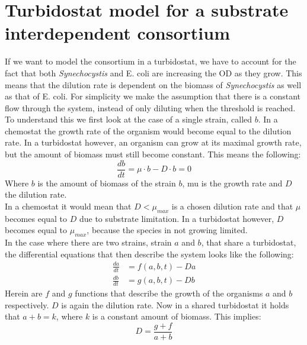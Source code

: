 \documentclass[12pt]{report}
\begin{document}
\section{Turbidostat model for a substrate interdependent consortium}\label{sec:turb}
If we want to model the consortium in a turbidostat, we have to account for the fact that both \textit{Synechocystis} and E. coli are increasing the OD as they grow. This means that the dilution rate is dependent on the biomass of \textit{Synechocystis} as well as that of E. coli.
For simplicity we make the assumption that there is a constant flow through the system, instead of only diluting when the threshold is reached.  To understand this we first look at the case of a single strain, called $b$. In a chemostat the growth rate of the organism would become equal to the dilution rate. In a turbidostat however, an organism can grow at its maximal growth rate, but the amount of biomass must still become constant. This means the following:
\begin{equation}
 \frac{db}{dt} = \mu \cdot b - D \cdot b = 0
\end{equation}
Where $b$ is the amount of biomass of the strain $b$, mu is the growth rate and $D$ the dilution rate.\\
In a chemostat it would mean that $D<\mu_{max}$ is a chosen dilution rate and that $\mu$ becomes equal to $D$ due to substrate limitation. In a turbidostat however, $D$ becomes equal to $\mu_{max}$, because the species in not growing limited.\\
In the case where there are two strains, strain $a$ and $b$, that share a turbidostat, the differential equations that then describe the system looks like the following:
\begin{align}
 \frac{da}{dt} &= f(a,b,t) - Da\\
 \frac{db}{dt} &= g(a,b,t) - Db
\end{align}
Herein are $f$ and $g$ functions that describe the growth of the organisms $a$ and $b$ respectively. $D$ is again the dilution rate. Now in a shared turbidostat it holds that $a+b=k$, where $k$ is a constant amount of biomass. This implies: 
\begin{equation}
 D = \frac{g + f}{a+b}
\end{equation}
\end{document}
